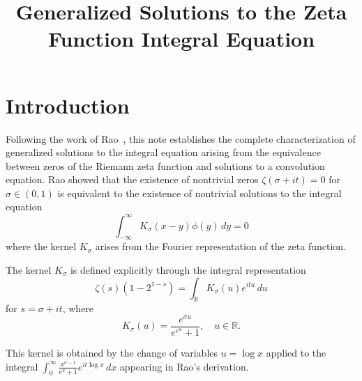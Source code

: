 \documentclass[11pt]{article}
\title{Generalized Solutions to the Zeta Function Integral Equation}
\author{}
\date{}
\begin{document}
\maketitle

\section{Introduction}

Following the work of Rao~\cite{rao2025}, this note establishes the complete characterization of generalized solutions to the integral equation arising from the equivalence between zeros of the Riemann zeta function and solutions to a convolution equation. Rao showed that the existence of nontrivial zeros $\zeta(\sigma + it) = 0$ for $\sigma \in (0,1)$ is equivalent to the existence of nontrivial solutions to the integral equation
\begin{equation}
\int_{-\infty}^{\infty} K_\sigma(x-y) \phi(y) \, dy = 0
\end{equation}
where the kernel $K_\sigma$ arises from the Fourier representation of the zeta function.

The kernel $K_\sigma$ is defined explicitly through the integral representation
\begin{equation}
\zeta(s)(1-2^{1-s}) = \int_{\mathbb{R}} K_\sigma(u) e^{itu} \, du
\end{equation}
for $s = \sigma + it$, where
\begin{equation}
K_\sigma(u) = \frac{e^{\sigma u}}{e^{e^u} + 1}, \quad u \in \mathbb{R}.
\end{equation}

This kernel is obtained by the change of variables $u = \log x$ applied to the integral $\int_0^\infty \frac{x^{\sigma-1}}{e^x + 1} e^{it \log x} \, dx$ appearing in Rao's derivation.
\end{document}
